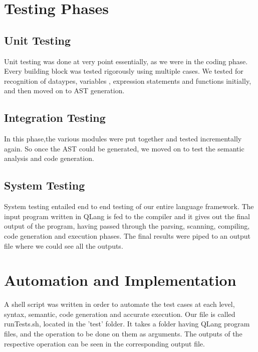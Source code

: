 \section{Testing Phases}

\subsection{Unit Testing}
Unit testing was done at very point essentially, as we were in the coding phase. Every building block was tested rigorously using multiple cases. We tested for recognition of dataypes, variables , expression statements and functions initially, and then moved on to AST generation.

\subsection{Integration Testing}
In this phase,the various modules were put together and tested incrementally again. So once the AST could be generated, we moved on to test the semantic analysis and code generation.

\subsection{System Testing}
System testing entailed end to end testing of our entire language framework. The input program written in QLang is fed to the compiler and it gives out the final output of the program, having passed through the parsing, scanning, compiling, code generation and execution phases. The final results were piped to an output file where we could see all the outputs.


\section{Automation and Implementation}
A shell script was written in order to automate the test cases at each level, syntax, semantic, code
generation and accurate execution. 
Our file is called runTests.sh, located in the 'test' folder. It takes a folder having QLang program files, and the operation to be done on them as arguments. The outputs of the respective operation can be seen in the corresponding output file. 



